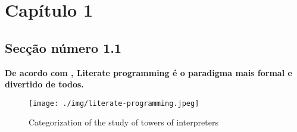 \documentclass[
12pt, a4paper,		%
openright,			%
oneside,			%
brazil, english		%
]{abntex2}
\begin{document}

\chapter{Capítulo 1}
\section{Secção número 1.1}

\textbf{De acordo com \cite{knuth1984literate}, Literate programming é o paradigma mais formal e divertido de todos.}

\begin{figure}[ht]
  \centering
  \caption{\label{fig:tower2} Categorization of the study of towers of interpreters}
  \texttt{[image: ./img/literate-programming.jpeg]}
\end{figure}

\lipsum[1-2] %

\end{document}
